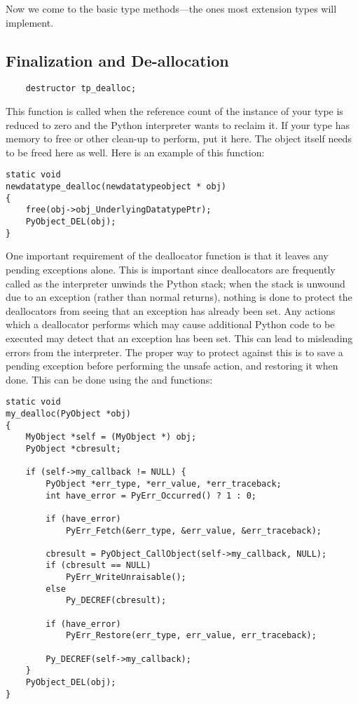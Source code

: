 Now we come to the basic type methods---the ones most extension types
will implement.


\subsection{Finalization and De-allocation}


\begin{verbatim}
    destructor tp_dealloc;
\end{verbatim}

This function is called when the reference count of the instance of
your type is reduced to zero and the Python interpreter wants to
reclaim it.  If your type has memory to free or other clean-up to
perform, put it here.  The object itself needs to be freed here as
well.  Here is an example of this function:

\begin{verbatim}
static void
newdatatype_dealloc(newdatatypeobject * obj)
{
    free(obj->obj_UnderlyingDatatypePtr);
    PyObject_DEL(obj);
}
\end{verbatim}

One important requirement of the deallocator function is that it
leaves any pending exceptions alone.  This is important since
deallocators are frequently called as the interpreter unwinds the
Python stack; when the stack is unwound due to an exception (rather
than normal returns), nothing is done to protect the deallocators from
seeing that an exception has already been set.  Any actions which a
deallocator performs which may cause additional Python code to be
executed may detect that an exception has been set.  This can lead to
misleading errors from the interpreter.  The proper way to protect
against this is to save a pending exception before performing the
unsafe action, and restoring it when done.  This can be done using the
 and
 functions:

\begin{verbatim}
static void
my_dealloc(PyObject *obj)
{
    MyObject *self = (MyObject *) obj;
    PyObject *cbresult;

    if (self->my_callback != NULL) {
        PyObject *err_type, *err_value, *err_traceback;
        int have_error = PyErr_Occurred() ? 1 : 0;

        if (have_error)
            PyErr_Fetch(&err_type, &err_value, &err_traceback);

        cbresult = PyObject_CallObject(self->my_callback, NULL);
        if (cbresult == NULL)
            PyErr_WriteUnraisable();
        else
            Py_DECREF(cbresult);

        if (have_error)
            PyErr_Restore(err_type, err_value, err_traceback);

        Py_DECREF(self->my_callback);
    }
    PyObject_DEL(obj);
}
\end{verbatim}


